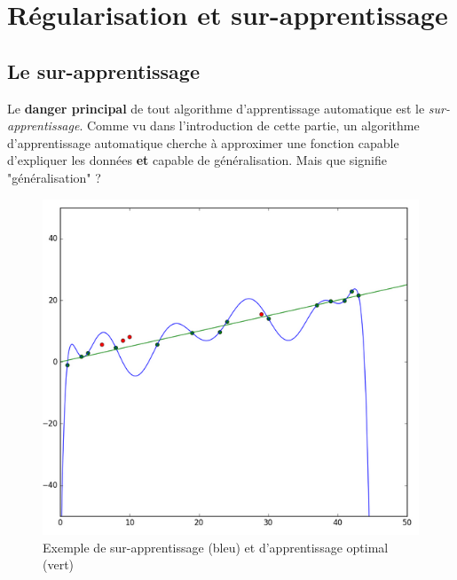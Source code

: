 \section{Régularisation et sur-apprentissage}

\subsection{Le sur-apprentissage}
\label{surappsec}

Le \textbf{danger principal} de tout algorithme d'apprentissage automatique est le \textit{sur-apprentissage}. Comme vu dans l'introduction de cette partie, un algorithme d'apprentissage automatique cherche à approximer une fonction capable d'expliquer les données \textbf{et} capable de généralisation. Mais que signifie "généralisation" ?\\

\begin{figure}
    \centering
    \includegraphics[scale=0.4]{./tex/regularisation/surapp.png}
    \caption{Exemple de sur-apprentissage (bleu) et d'apprentissage optimal (vert)}
    \label{surapp}
\end{figure}

